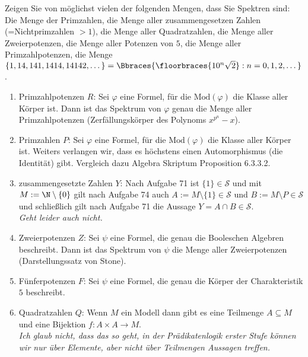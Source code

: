 
\begin{exercise}[75]

\phantom{}
	Zeigen Sie von möglichst vielen der folgenden Mengen, dass Sie Spektren sind: Die Menge der Primzahlen, die Menge aller zusammengesetzen Zahlen (=Nichtprimzahlen $> 1$), die Menge aller Quadratzahlen, die Menge aller Zweierpotenzen, die Menge aller Potenzen von $5$, die Menge aller Primzahlpotenzen, die Menge $\{1, 14, 141, 1414, 14142, \dots \} = \Bbraces{\floorbraces{10^n \sqrt{2}} : n = 0, 1, 2, \dots}$.

\end{exercise}


\begin{solution}
\phantom{}

	\begin{enumerate}[label = \arabic*.]
		\item Primzahlpotenzen $R$: Sei $\varphi$ eine Formel, für die $\mathrm{Mod}(\varphi)$ die Klasse aller Körper ist.
		Dann ist das Spektrum von $\varphi$ genau die Menge aller Primzahlpotenzen (Zerfällungskörper des Polynoms $x^{p^n}- x$).

		\item Primzahlen $P$: Sei $\varphi$ eine Formel, für die $\mathrm{Mod}(\varphi)$ die Klasse aller Körper ist. Weiters verlangen wir, dass es höchstens einen Automorphismus (die Identität) gibt. Vergleich dazu Algebra Skriptum Proposition 6.3.3.2.

		\item zusammengesetzte Zahlen $Y$: Nach Aufgabe 71 ist $\{1\} \in \mathscr{S}$ und mit $M := \N \setminus \{0\}$ gilt  nach Aufgabe 74 auch $A:= M \setminus \{1\} \in \mathscr{S}$ und $B := M \setminus P \in \mathscr{S}$ und schließlich gilt nach Aufgabe 71 die Aussage $Y = A \cap B \in \mathscr{S}$. \\
		\textit{Geht leider auch nicht.}

		\item Zweierpotenzen $Z$: Sei $\psi$ eine Formel, die genau die Booleschen Algebren beschreibt. Dann ist das Spektrum von $\psi$ die Menge aller Zweierpotenzen (Darstellungssatz von Stone).

		\item Fünferpotenzen $F$: Sei $\psi$ eine Formel, die genau die Körper der
		Charakteristik $5$ beschreibt.

		\item Quadratzahlen $Q$: Wenn $M$ ein Modell dann gibt es eine Teilmenge $A \subseteq M$ und eine Bijektion $f: A \times A \to M$. \\
		\textit{Ich glaub nicht, dass das so geht, in der Prädikatenlogik erster
		Stufe können wir nur über Elemente, aber nicht über Teilmengen Aussagen treffen.}
	\end{enumerate}

\end{solution}
